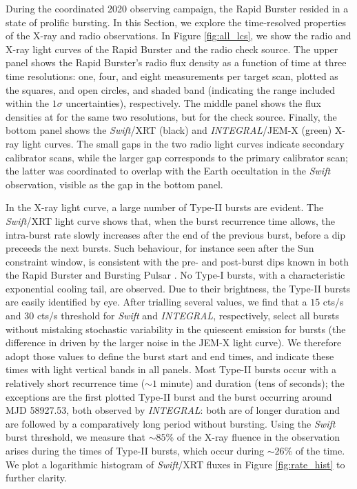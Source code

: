 \documentclass[fleqn,usenatbib]{mnras}
\begin{document}
During the coordinated 2020 observing campaign, the Rapid Burster resided in a state of prolific bursting. In this Section, we explore the time-resolved properties of the X-ray and radio observations. In Figure \ref{fig:all_lcs}, we show the radio and X-ray light curves of the Rapid Burster and the radio check source. The upper panel shows the Rapid Burster's radio flux density as a function of time at three time resolutions: one, four, and eight measurements per target scan, plotted as the squares, and open circles, and shaded band (indicating the range included within the $1\sigma$ uncertainties), respectively. The middle panel shows the flux densities at for the same two resolutions, but for the check source. Finally, the bottom panel shows the \textit{Swift}/XRT (black) and \textit{INTEGRAL}/JEM-X (green) X-ray light curves. The small gaps in the two radio light curves indicate secondary calibrator scans, while the larger gap corresponds to the primary calibrator scan; the latter was coordinated to overlap with the Earth occultation in the \textit{Swift} observation, visible as the gap in the bottom panel. 

In the X-ray light curve, a large number of Type-II bursts are evident. The \textit{Swift}/XRT light curve shows that, when the burst recurrence time allows, the intra-burst rate slowly increases after the end of the previous burst, before a dip preceeds the next bursts. Such behaviour, for instance seen after the Sun constraint window, is consistent with the pre- and post-burst dips known in both the Rapid Burster and Bursting Pulsar \citep{bagnoli2015,younes2015,court2018}. No Type-I bursts, with a characteristic exponential cooling tail, are observed. Due to their brightness, the Type-II bursts are easily identified by eye. After trialling several values, we find that a $15$ cts/s and $30$ cts/s threshold for \textit{Swift} and \textit{INTEGRAL}, respectively, select all bursts without mistaking stochastic variability in the quiescent emission for bursts (the difference in driven by the larger noise in the JEM-X light curve). We therefore adopt those values to define the burst start and end times, and indicate these times with light vertical bands in all panels. Most Type-II bursts occur with a relatively short recurrence time ($\sim 1$ minute) and duration (tens of seconds); the exceptions are the first plotted Type-II burst and the burst occurring around MJD 58927.53, both observed by \textit{INTEGRAL}: both are of longer duration and are followed by a comparatively long period without bursting. Using the \textit{Swift} burst threshold, we measure that $\sim 85$\% of the X-ray fluence in the observation arises during the times of Type-II bursts, which occur during $\sim 26$\% of the time. We plot a logarithmic histogram of \textit{Swift}/XRT fluxes in Figure \ref{fig:rate_hist} to further clarity.
\end{document}
